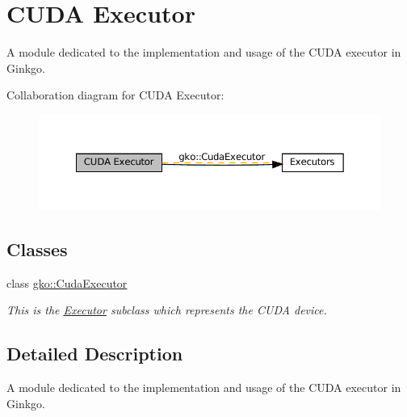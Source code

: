 \hypertarget{group__exec__cuda}{}\section{C\+U\+DA Executor}
\label{group__exec__cuda}


A module dedicated to the implementation and usage of the C\+U\+DA executor in Ginkgo.  


Collaboration diagram for C\+U\+DA Executor\+:
\nopagebreak
\begin{figure}[H]
\begin{center}
\leavevmode
\includegraphics[width=350pt]{group__exec__cuda}
\end{center}
\end{figure}
\subsection*{Classes}
\begin{DoxyCompactItemize}
\item 
class \hyperlink{classgko_1_1CudaExecutor}{gko\+::\+Cuda\+Executor}
\begin{DoxyCompactList}\small\item\em This is the \hyperlink{classgko_1_1Executor}{Executor} subclass which represents the C\+U\+DA device. \end{DoxyCompactList}\end{DoxyCompactItemize}


\subsection{Detailed Description}
A module dedicated to the implementation and usage of the C\+U\+DA executor in Ginkgo. 

